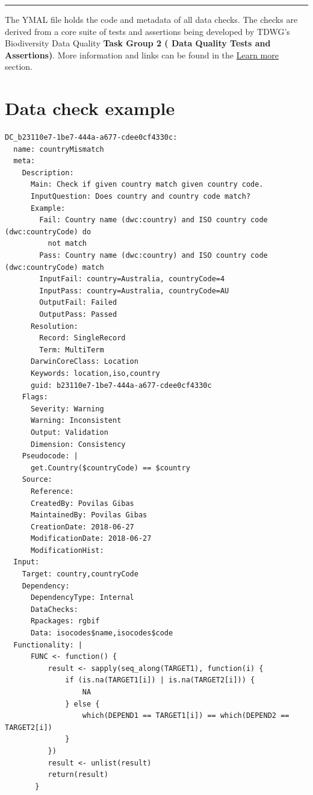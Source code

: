 \documentclass[]{book}
\theoremstyle{definition}
\theoremstyle{definition}
\theoremstyle{definition}
\theoremstyle{remark}
\begin{document}
\begin{center}\rule{0.5\linewidth}{\linethickness}\end{center}

The YMAL file holds the code and metadata of all data checks. The checks
are derived from a core suite of tests and assertions being developed by
TDWG's Biodiversity Data Quality \textbf{Task Group 2 ( Data Quality
Tests and Assertions)}. More information and links can be found in the
\protect\hyperlink{learn-more}{Learn more} section.

\section{Data check example}\label{data-check-example}

\begin{verbatim}
DC_b23110e7-1be7-444a-a677-cdee0cf4330c:
  name: countryMismatch
  meta:
    Description:
      Main: Check if given country match given country code.
      InputQuestion: Does country and country code match?
      Example:
        Fail: Country name (dwc:country) and ISO country code (dwc:countryCode) do
          not match
        Pass: Country name (dwc:country) and ISO country code (dwc:countryCode) match
        InputFail: country=Australia, countryCode=4
        InputPass: country=Australia, countryCode=AU
        OutputFail: Failed
        OutputPass: Passed
      Resolution:
        Record: SingleRecord
        Term: MultiTerm
      DarwinCoreClass: Location
      Keywords: location,iso,country
      guid: b23110e7-1be7-444a-a677-cdee0cf4330c
    Flags:
      Severity: Warning
      Warning: Inconsistent
      Output: Validation
      Dimension: Consistency
    Pseudocode: |
      get.Country($countryCode) == $country
    Source:
      Reference:
      CreatedBy: Povilas Gibas
      MaintainedBy: Povilas Gibas
      CreationDate: 2018-06-27
      ModificationDate: 2018-06-27
      ModificationHist:
  Input:
    Target: country,countryCode
    Dependency:
      DependencyType: Internal
      DataChecks:
      Rpackages: rgbif 
      Data: isocodes$name,isocodes$code
  Functionality: |
      FUNC <- function() {
          result <- sapply(seq_along(TARGET1), function(i) {
              if (is.na(TARGET1[i]) | is.na(TARGET2[i])) {
                  NA
              } else {
                  which(DEPEND1 == TARGET1[i]) == which(DEPEND2 == TARGET2[i])
              }
          })
          result <- unlist(result)
          return(result)
       }
\end{verbatim}
\end{document}
